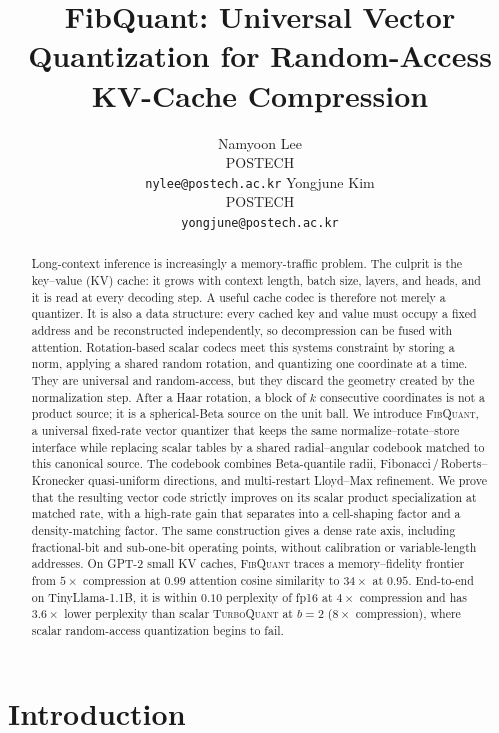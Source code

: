 \documentclass{article}
\title{FibQuant: Universal Vector Quantization for Random-Access 
KV-Cache Compression}
\author{Namyoon Lee \\
POSTECH \\
\texttt{nylee@postech.ac.kr}
\And
Yongjune Kim \\
POSTECH \\
\texttt{yongjune@postech.ac.kr}}
\theoremstyle{definition}
\theoremstyle{remark}
\begin{document}
\maketitle

\begin{abstract}
Long-context inference is increasingly a memory-traffic problem.
The culprit is the key--value (KV) cache: it grows with context
length, batch size, layers, and heads, and it is read at every
decoding step.  A useful cache codec is therefore not merely a
quantizer.  It is also a data structure: every cached key and value
must occupy a fixed address and be reconstructed independently, so
decompression can be fused with attention.  Rotation-based scalar
codecs meet this systems constraint by storing a norm, applying a
shared random rotation, and quantizing one coordinate at a time.
They are universal and random-access, but they discard the geometry
created by the normalization step.  After a Haar rotation, a block
of $k$ consecutive coordinates is not a product source; it is a
spherical-Beta source on the unit ball.  We introduce
\textsc{FibQuant}, a universal fixed-rate vector quantizer that
keeps the same normalize--rotate--store interface while replacing
scalar tables by a shared radial--angular codebook matched to this
canonical source.  The codebook combines Beta-quantile radii,
Fibonacci\,/\,Roberts--Kronecker quasi-uniform directions, and
multi-restart Lloyd--Max refinement.  We prove that the resulting
vector code strictly improves on its scalar product specialization
at matched rate, with a high-rate gain that separates into a
cell-shaping factor and a density-matching factor.  The same
construction gives a dense rate axis, including fractional-bit and
sub-one-bit operating points, without calibration or variable-length
addresses.  On GPT-2 small KV caches, \textsc{FibQuant} traces a
memory--fidelity frontier from $5\times$ compression at $0.99$
attention cosine similarity to $34\times$ at $0.95$.  End-to-end on
TinyLlama-1.1B, it is within $0.10$ perplexity of fp16 at $4\times$
compression and has $3.6\times$ lower perplexity than scalar
\textsc{TurboQuant} at $b = 2$ ($8\times$ compression), where scalar
random-access quantization begins to fail.
\end{abstract}

\section{Introduction}
\label{sec:intro}
\end{document}
